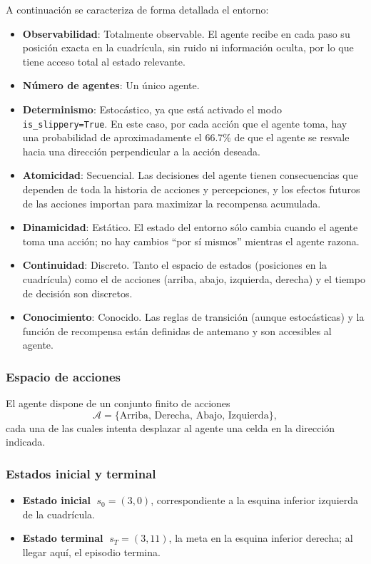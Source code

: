 A continuación se caracteriza de forma detallada el entorno:

\begin{itemize}
    \item \textbf{Observabilidad}: Totalmente observable. El agente recibe en cada paso su posición exacta en la cuadrícula, sin ruido ni información oculta, por lo que tiene acceso total al estado relevante.
    \item \textbf{Número de agentes}: Un único agente.
    \item \textbf{Determinismo}: Estocástico, ya que está activado el modo \texttt{is\_slippery=True}. En este caso, por cada acción que el agente toma, hay una probabilidad de aproximadamente el 66.7\% de que el agente se resvale hacia una dirección perpendicular a la acción deseada.
    \item \textbf{Atomicidad}: Secuencial. Las decisiones del agente tienen consecuencias que dependen de toda la historia de acciones y percepciones, y los efectos futuros de las acciones importan para maximizar la recompensa acumulada.
    \item \textbf{Dinamicidad}: Estático. El estado del entorno sólo cambia cuando el agente toma una acción; no hay cambios “por sí mismos” mientras el agente razona.
    \item \textbf{Continuidad}: Discreto. Tanto el espacio de estados (posiciones en la cuadrícula) como el de acciones (arriba, abajo, izquierda, derecha) y el tiempo de decisión son discretos.
    \item \textbf{Conocimiento}: Conocido. Las reglas de transición (aunque estocásticas) y la función de recompensa están definidas de antemano y son accesibles al agente.
\end{itemize}

\subsubsection{Espacio de acciones}

El agente dispone de un conjunto finito de acciones
\[
  \mathcal{A} = \{\text{Arriba},\, \text{Derecha},\, \text{Abajo},\, \text{Izquierda}\},
\]
cada una de las cuales intenta desplazar al agente una celda en la dirección indicada.

\subsubsection{Estados inicial y terminal}
\begin{itemize}
  \item \textbf{Estado inicial} $\;s_0=(3,0)$, correspondiente a la esquina inferior izquierda de la cuadrícula.
  \item \textbf{Estado terminal} $\;s_T=(3,11)$, la meta en la esquina inferior derecha; al llegar aquí, el episodio termina.
\end{itemize}

